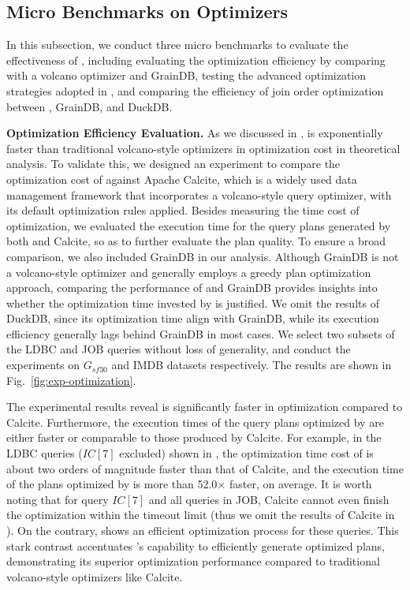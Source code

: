 \subsection{Micro Benchmarks on Optimizers}
\label{sec:experiment-opt}
In this subsection, we conduct three micro benchmarks to evaluate the effectiveness of \name,
including evaluating the optimization efficiency by comparing \name with a volcano optimizer and GrainDB, testing the advanced optimization strategies adopted in \name, and comparing the efficiency of join order optimization between \name, GrainDB, and DuckDB.

\noindent\textbf{Optimization Efficiency Evaluation.}
As we discussed in , \name is exponentially faster than traditional volcano-style optimizers in optimization cost in theoretical analysis.
To validate this, we designed an experiment to compare the optimization cost of \name against Apache Calcite, which is a widely used data management framework that incorporates a volcano-style query optimizer, with its default optimization rules applied.
Besides measuring the time cost of optimization, we evaluated the execution time for the query plans generated by both \name and Calcite, so as to further evaluate the plan quality.
To ensure a broad comparison, we also included GrainDB in our analysis. Although GrainDB is not a volcano-style optimizer and generally employs a greedy plan optimization approach,
comparing the performance of \name and GrainDB provides insights into whether the optimization time invested by \name is justified.
We omit the results of DuckDB, since its optimization time align with GrainDB, while its execution efficiency generally lags behind GrainDB in most cases.
We select two subsets of the LDBC and JOB queries without loss of generality, and conduct the experiments on $G_{sf30}$ and IMDB datasets respectively.
The results are shown in Fig.~\ref{fig:exp-optimization}.

The experimental results reveal \name is significantly faster in optimization compared to Calcite.
Furthermore, the execution times of the query plans optimized by \name are either faster or comparable to those produced by Calcite.
For example, in the LDBC queries ($IC[7]$ excluded) shown in , the optimization time cost of \name is about two orders of magnitude faster than that of Calcite, and the execution time of the plans optimized by \name is more than 52.0$\times$ faster, on average.
It is worth noting that for query $IC[7]$ and all queries in JOB, Calcite cannot even finish the optimization within the timeout limit (thus we omit the results of Calcite in ).
On the contrary, \name shows an efficient optimization process for these queries.
This stark contrast accentuates \name's capability to efficiently generate optimized plans, demonstrating its superior optimization performance compared to traditional volcano-style optimizers like Calcite.

